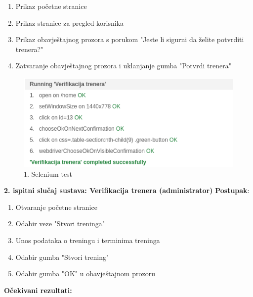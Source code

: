 		\begin{enumerate}
		    \item Prikaz početne stranice
                \item Prikaz stranice za pregled korisnika
                \item Prikaz obavještajnog prozora s porukom "Jeste li sigurni da želite potvrditi trenera?"
                \item Zatvaranje obavještajnog prozora i uklanjanje gumba "Potvrdi trenera"
		\end{enumerate}
            \begin{figure}[H]
		\includegraphics[scale=1]{./Slike/verifikacija_trenera.png}
		\centering
		\caption{1. Selenium test}
		\label{fig:promjene}
	    \end{figure}
     \noindent \textbf{2. ispitni slučaj sustava: Verifikacija trenera (administrator)}
            \newline \textbf{Postupak}:
            \begin{enumerate}
                
            \item Otvaranje početne stranice

            \item Odabir veze "Stvori treninga"

            \item Unos podataka o treningu i terminima treninga

            \item Odabir gumba "Stvori trening"

            \item Odabir gumba "OK" u obavještajnom prozoru

            \end{enumerate}
            \textbf{Očekivani rezultati:}
            
